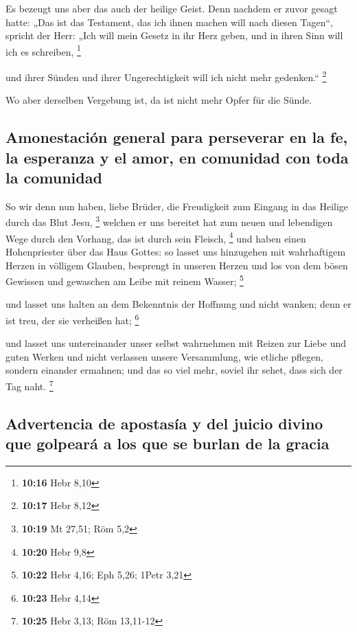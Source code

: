  Es bezeugt uns aber das auch der heilige Geist. Denn
nachdem er zuvor gesagt hatte:  „Das ist das Testament,
das ich ihnen machen will nach diesen Tagen``, spricht der Herr: „Ich
will mein Gesetz in ihr Herz geben, und in ihren Sinn will ich es
schreiben, \footnote{\textbf{10:16} Hebr 8,10}

 und ihrer Sünden und ihrer Ungerechtigkeit will ich
nicht mehr gedenken.`` \footnote{\textbf{10:17} Hebr 8,12}

 Wo aber derselben Vergebung ist, da ist nicht mehr Opfer
für die Sünde.

\hypertarget{amonestaciuxf3n-general-para-perseverar-en-la-fe-la-esperanza-y-el-amor-en-comunidad-con-toda-la-comunidad}{%
\subsection{Amonestación general para perseverar en la fe, la esperanza
y el amor, en comunidad con toda la
comunidad}\label{amonestaciuxf3n-general-para-perseverar-en-la-fe-la-esperanza-y-el-amor-en-comunidad-con-toda-la-comunidad}}

 So wir denn nun haben, liebe Brüder, die Freudigkeit zum
Eingang in das Heilige durch das Blut Jesu, \footnote{\textbf{10:19} Mt
  27,51; Röm 5,2}  welchen er uns bereitet hat zum neuen
und lebendigen Wege durch den Vorhang, das ist durch sein Fleisch,
\footnote{\textbf{10:20} Hebr 9,8}  und haben einen
Hohenpriester über das Haus Gottes:  so lasset uns
hinzugehen mit wahrhaftigem Herzen in völligem Glauben, besprengt in
unseren Herzen und los von dem bösen Gewissen und gewaschen am Leibe mit
reinem Wasser; \footnote{\textbf{10:22} Hebr 4,16; Eph 5,26; 1Petr 3,21}

 und lasset uns halten an dem Bekenntnis der Hoffnung und
nicht wanken; denn er ist treu, der sie verheißen hat; \footnote{\textbf{10:23}
  Hebr 4,14}

 und lasset uns untereinander unser selbst wahrnehmen mit
Reizen zur Liebe und guten Werken  und nicht verlassen
unsere Versammlung, wie etliche pflegen, sondern einander ermahnen; und
das so viel mehr, soviel ihr sehet, dass sich der Tag naht. \footnote{\textbf{10:25}
  Hebr 3,13; Röm 13,11-12}

\hypertarget{advertencia-de-apostasuxeda-y-del-juicio-divino-que-golpearuxe1-a-los-que-se-burlan-de-la-gracia}{%
\subsection{Advertencia de apostasía y del juicio divino que golpeará a
los que se burlan de la
gracia}\label{advertencia-de-apostasuxeda-y-del-juicio-divino-que-golpearuxe1-a-los-que-se-burlan-de-la-gracia}}

